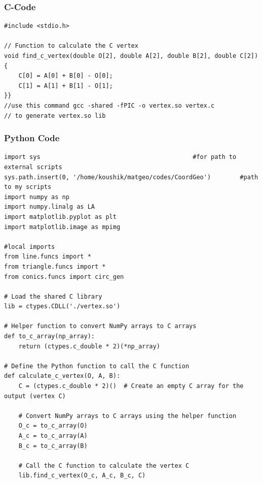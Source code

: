 \documentclass{beamer}
\begin{document}
\begin{frame}[fragile]
\frametitle{C-Code}
\begin{verbatim}
#include <stdio.h>

// Function to calculate the C vertex
void find_c_vertex(double O[2], double A[2], double B[2], double C[2]) {
    C[0] = A[0] + B[0] - O[0];
    C[1] = A[1] + B[1] - O[1];
}}
//use this command gcc -shared -fPIC -o vertex.so vertex.c 
// to generate vertex.so lib
\end{verbatim}
\end{frame}
\begin{frame}[fragile]
  \frametitle{Python Code }

\begin{verbatim}
import sys                                          #for path to external scripts
sys.path.insert(0, '/home/koushik/matgeo/codes/CoordGeo')        #path to my scripts
import numpy as np
import numpy.linalg as LA
import matplotlib.pyplot as plt
import matplotlib.image as mpimg

#local imports
from line.funcs import *
from triangle.funcs import *
from conics.funcs import circ_gen

# Load the shared C library
lib = ctypes.CDLL('./vertex.so')

# Helper function to convert NumPy arrays to C arrays
def to_c_array(np_array):
    return (ctypes.c_double * 2)(*np_array)

# Define the Python function to call the C function
def calculate_c_vertex(O, A, B):
    C = (ctypes.c_double * 2)()  # Create an empty C array for the output (vertex C)

    # Convert NumPy arrays to C arrays using the helper function
    O_c = to_c_array(O)
    A_c = to_c_array(A)
    B_c = to_c_array(B)

    # Call the C function to calculate the vertex C
    lib.find_c_vertex(O_c, A_c, B_c, C)
\end{verbatim}
\end{frame}
\end{document}
